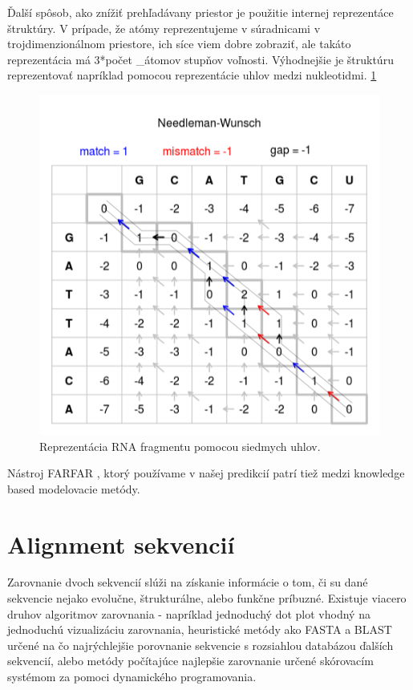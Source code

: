 \indent Ďalší spôsob, ako znížiť  prehľadávany priestor je použitie internej reprezentáce štruktúry. V prípade, že atómy reprezentujeme v súradnicami v trojdimenzionálnom priestore, ich síce viem dobre zobraziť, ale takáto reprezentácia má 3*počet \_átomov stupňov voľnosti. Výhodnejšie je štruktúru reprezentovať napríklad pomocou reprezentácie uhlov medzi nukleotidmi.  \ref{obr02:reptesentation}


\begin{figure}%
\includegraphics[width=\textwidth]{../img/needlemanwunsch}
\caption{Reprezentácia RNA fragmentu pomocou siedmych uhlov. \cite{Frellsen09} }
\label{obr02:reptesentation}
\end{figure}


\indent Nástroj FARFAR \cite{Das10}, ktorý používame v našej predikcií patrí tiež medzi knowledge based modelovacie metódy.


\section{Alignment sekvencií}
Zarovnanie dvoch sekvencií slúži na získanie informácie o tom, či su dané sekvencie nejako evolučne, štrukturálne, alebo funkčne príbuzné. Existuje viacero druhov algoritmov zarovnania - napríklad jednoduchý dot plot vhodný na jednoduchú vizualizáciu zarovnania, heuristické metódy ako FASTA a BLAST určené na čo najrýchlejšie porovnanie sekvencie s rozsiahlou databázou ďalších sekvencií, alebo metódy počítajúce najlepšie zarovnanie určené skórovacím systémom za pomoci dynamického programovania.


